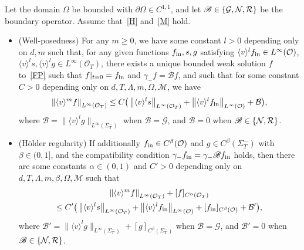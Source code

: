 \documentclass[AHL,Unicode,longabstracts,published]{cedram}
\newcommand*\p{\partial}
\newcommand*\fin {f_{\rm in}}
\newcommand*\M {{\mathcal{M}}}
\newcommand*\NN {{\mathcal{N}\hspace{-.3mm}}}
\newcommand*\Gi {\mathcal{G}}
\newcommand*\BB {\mathscr{B}}
\newcommand{\clB}{\mathcal{B}}
\newcommand*\RR {\mathcal{R}}
\newcommand*\OO {\mathcal{O}}
\newcommand{\lv}{\langle v\rangle}
\begin{document}
\begin{theo}\label{thm}
Let the domain $\Omega$ be bounded with $\p\Omega\in C^{1,1}$, and let $\BB\in\{\Gi,\NN,\RR\}$ be the boundary operator. Assume that~\eqref{H} and~\eqref{M} hold. \vspace{-2.5mm}
\begin{itemize}
\item(Well-posedness) For any $m\ge0$, we have some constant $l>0$ depending only on $d,m$ such that, for any given functions $\fin,s,g$ satisfying $\lv^l\fin\in L^\infty(\OO)$, $\lv^ls,\lv^lg\in L^\infty(\OO_T)$, there exists a unique bounded weak solution $f$ to~\eqref{FP} such that $f|_{t=0}=\fin$ and $\gamma_-f=\BB f$, and such that for some constant $C>0$ depending only on $d,T,\Lambda,m,\Omega,\M$, we have
\begin{align*}
\left\|\lv^mf\right\|_{L^\infty(\OO_T)}
\le C\big(\left\|\lv^ls\right\|_{L^\infty(\OO_T)} +
\left\|\lv^l\fin\right\|_{L^\infty(\OO)} +\clB\big),
\end{align*}
where $\clB=\|\lv^lg\|_{L^\infty(\Sigma_T^-)}$ when $\BB=\Gi$, and $\clB=0$ when $\BB\in\{\NN,\RR\}$.

\item(H\"older regularity) If additionally $\fin\in C^\beta(\OO)$ and $g\in C^\beta(\Sigma_T^-)$ with $\beta\in(0,1]$, and the compatibility condition $\gamma_-\fin=\gamma_-\BB\fin$ holds, then there are some constants $\alpha\in(0,1)$ and $C'>0$ depending only on $d,T,\Lambda,m,\beta,\Omega,\M$ such that
\begin{multline*}
\left\|\lv^mf\right\|_{L^\infty(\OO_T)}+[f]_{C^\alpha(\OO_T)}\\
\le C'\big(\left\|\lv^ls\right\|_{L^\infty(\OO_T)} +\left\|\lv^l\fin\right\|_{L^\infty(\OO)}+[\fin]_{C^\beta(\OO)} +\clB' \big),
\end{multline*}
where $\clB'=\|\lv^lg\|_{L^\infty(\Sigma_T^-)}+[g]_{C^\beta(\Sigma_T^-)}$ when $\BB=\Gi$, and $\clB'=0$ when $\BB\in\{\NN,\RR\}$.
\end{itemize}
\end{theo}
\end{document}
